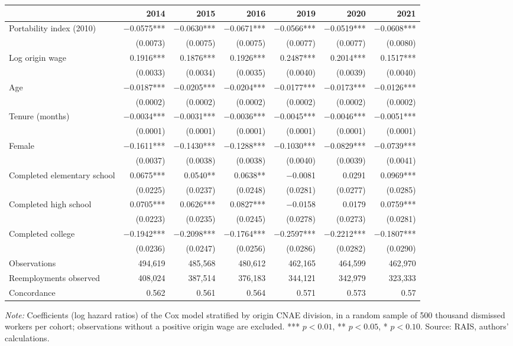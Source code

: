 {\footnotesize
\setlength{\tabcolsep}{3.5pt}
\begin{threeparttable}
\begin{tabular}{lrrrrrr}
\toprule
 & 2014 & 2015 & 2016 & 2019 & 2020 & 2021 \\
\midrule
Portability index (2010) & $-$0.0575*** & $-$0.0630*** & $-$0.0671*** & $-$0.0566*** & $-$0.0519*** & $-$0.0608*** \\
 & (0.0073) & (0.0075) & (0.0075) & (0.0077) & (0.0077) & (0.0080) \\
Log origin wage & 0.1916*** & 0.1876*** & 0.1926*** & 0.2487*** & 0.2014*** & 0.1517*** \\
 & (0.0033) & (0.0034) & (0.0035) & (0.0040) & (0.0039) & (0.0040) \\
Age & $-$0.0187*** & $-$0.0205*** & $-$0.0204*** & $-$0.0177*** & $-$0.0173*** & $-$0.0126*** \\
 & (0.0002) & (0.0002) & (0.0002) & (0.0002) & (0.0002) & (0.0002) \\
Tenure (months) & $-$0.0034*** & $-$0.0031*** & $-$0.0036*** & $-$0.0045*** & $-$0.0046*** & $-$0.0051*** \\
 & (0.0001) & (0.0001) & (0.0001) & (0.0001) & (0.0001) & (0.0001) \\
Female & $-$0.1611*** & $-$0.1430*** & $-$0.1288*** & $-$0.1030*** & $-$0.0829*** & $-$0.0739*** \\
 & (0.0037) & (0.0038) & (0.0038) & (0.0040) & (0.0039) & (0.0041) \\
Completed elementary school & 0.0675*** & 0.0540** & 0.0638** & $-$0.0081 & 0.0291 & 0.0969*** \\
 & (0.0225) & (0.0237) & (0.0248) & (0.0281) & (0.0277) & (0.0285) \\
Completed high school & 0.0705*** & 0.0626*** & 0.0827*** & $-$0.0158 & 0.0179 & 0.0759*** \\
 & (0.0223) & (0.0235) & (0.0245) & (0.0278) & (0.0273) & (0.0281) \\
Completed college & $-$0.1942*** & $-$0.2098*** & $-$0.1764*** & $-$0.2597*** & $-$0.2212*** & $-$0.1807*** \\
 & (0.0236) & (0.0247) & (0.0256) & (0.0286) & (0.0282) & (0.0290) \\
\midrule
Observations & 494,619 & 485,568 & 480,612 & 462,165 & 464,599 & 462,970 \\
Reemployments observed & 408,024 & 387,514 & 376,183 & 344,121 & 342,979 & 323,333 \\
Concordance & 0.562 & 0.561 & 0.564 & 0.571 & 0.573 & 0.57 \\
\bottomrule
\end{tabular}
\begin{tablenotes}[flushleft]\footnotesize
\item \textit{Note:} Coefficients (log hazard ratios) of the Cox model stratified by origin CNAE division, in a random sample of 500 thousand dismissed workers per cohort; observations without a positive origin wage are excluded. *** $p<0.01$, ** $p<0.05$, * $p<0.10$. Source: RAIS, authors' calculations.
\end{tablenotes}
\end{threeparttable}
}
